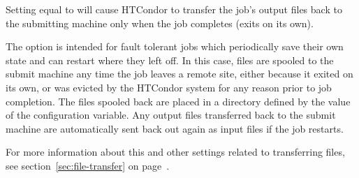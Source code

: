 \begin{description}
Setting  equal to  will
cause HTCondor to transfer the job's output files back to the submitting
machine only when the job completes (exits on its own).

The  option is intended for fault tolerant
jobs which periodically save their own state and can restart where
they left off.
In this case, files are spooled to the submit machine any time the
job leaves a remote site, either because it exited on its own, or was
evicted by the HTCondor system for any reason prior to job completion.
The files spooled back are placed in a directory defined by
the value of the  configuration variable.
Any output files transferred back to the submit machine are
automatically sent back out again as input files if the job restarts.

For more information about this and other settings related to
transferring files, see section~\ref{sec:file-transfer} on
page~\pageref{sec:file-transfer}.

\end{description} 

